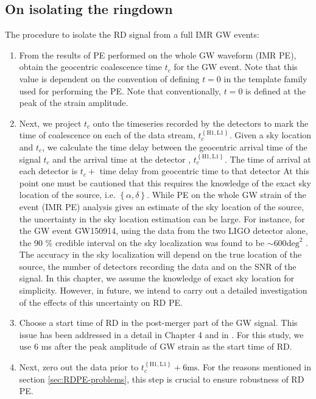 \subsection{On isolating the ringdown}
\label{sec:isolate-rd}
The procedure to isolate the RD signal from a full IMR GW events: 
\begin{enumerate}
\item From the results of PE performed on the whole GW waveform (IMR PE), obtain the geocentric coalescence time $t_c$ for the GW event. Note that this value is dependent on the convention of defining $t=0$ in the template family used for performing the PE. Note that conventionally, $t=0$ is defined at the peak of the strain amplitude.
\item Next, we project $t_{c}$ onto the timeseries recorded by the detectors to mark the time of coalescence on each of the data stream, $t_{c}^{\left\lbrace \mathrm{H1,L1} \right\rbrace}$. Given a sky location and $t_{c}$, we calculate the time delay between the geocentric arrival time of the signal $t_{c}$ and the arrival time at the detector , $t_{c}^{\left\lbrace \mathrm{H1,L1} \right\rbrace}$. The time of arrival at each detector is  $t_{c} +$ time delay from geocentric time to that detector 
At this point one must be cautioned that this requires the knowledge of the exact sky location of the source, i.e. $\left\lbrace \alpha, \delta \right\rbrace$. While PE on the whole GW strain of the event (IMR PE) analysis gives an estimate of the sky location of the source, the uncertainty in the sky location estimation can be large. For instance, for the GW event GW150914, using the data from the two LIGO detector alone, the 90 \% credible interval on the sky localization was found to be $\sim 600 \mathrm{deg}^{2}$ \cite{skyloc:GW150914}. The accuracy in the sky localization will depend on the true location of the source, the number of detectors recording the data and on the SNR of the signal. In this chapter, we assume the knowledge of exact sky location for simplicity. However, in future, we intend to carry out a detailed investigation of the effects of this uncertainty on RD PE.   
\item Choose a start time of RD in the post-merger part of the GW signal. This issue has been addressed in a detail in Chapter 4 and in \cite{EMOP,Baibhav:2017jhs,London,2012PhRvL.109n1102K}. For this study, we use 6 ms after the peak amplitude of GW strain as the start time of RD. 
\item Next, zero out the data prior to $t_{c}^{\left\lbrace \mathrm{H1,L1} \right\rbrace} + 6 \mathrm{ms}$. For the reasons mentioned in section \ref{sec:RDPE-problems}, this step is crucial to ensure robustness of RD PE.   
\end{enumerate}

